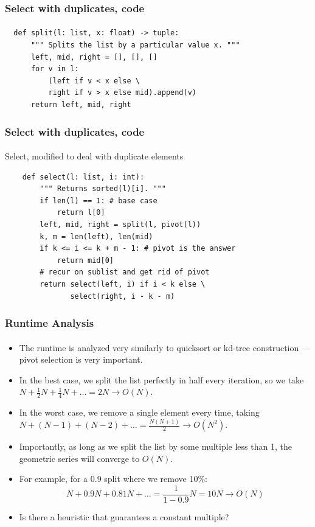\documentclass{beamer}                             %
\begin{document}
\begin{frame}[fragile]
\frametitle{Select with duplicates, code}
\framesubtitle{}
\begin{verbatim}
  def split(l: list, x: float) -> tuple:
      """ Splits the list by a particular value x. """
      left, mid, right = [], [], []
      for v in l:
          (left if v < x else \
          right if v > x else mid).append(v)
      return left, mid, right
\end{verbatim} 
\end{frame}

\begin{frame}[fragile]
\frametitle{Select with duplicates, code}
\framesubtitle{}
\begin{algorithm}[H]
  \caption{Select, modified to deal with duplicate elements}
  \begin{verbatim}
    def select(l: list, i: int):
        """ Returns sorted(l)[i]. """
        if len(l) == 1: # base case
            return l[0]
        left, mid, right = split(l, pivot(l))
        k, m = len(left), len(mid)
        if k <= i <= k + m - 1: # pivot is the answer
            return mid[0]
        # recur on sublist and get rid of pivot
        return select(left, i) if i < k else \
               select(right, i - k - m)
  \end{verbatim}
\end{algorithm}
\end{frame}

\begin{frame}
\frametitle{Runtime Analysis}
\framesubtitle{}
\begin{itemize}
  \item The runtime is analyzed very similarly to quicksort or
    kd-tree construction --- pivot selection is very important.
  \item In the best case, we split the list perfectly in
    half every iteration, so we take
    \( N + \frac{1}{2}N + \frac{1}{4}N + \ldots = 2N
      \rightarrow O(N) \). \pause
  \item In the worst case, we remove a single element every time, taking
    \( N + (N - 1) + (N - 2) + \ldots = \frac{N(N + 1)}{2}
      \rightarrow O(N^2) \). \pause
  \item Importantly, as long as we split the list by some multiple
    less than 1, the geometric series will converge to \( O(N) \).
  \item For example, for a \( 0.9 \) split where we remove 10\%:
    \[ N + 0.9N + 0.81N + \ldots = \frac{1}{1 - 0.9} N = 10N
      \rightarrow O(N) \] \pause
  \item Is there a heuristic that guarantees a constant multiple?
\end{itemize}
\end{frame}
\end{document}

